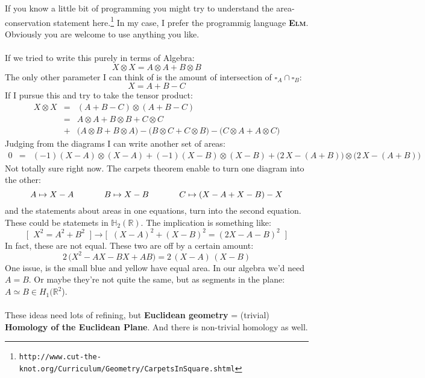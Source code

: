 \documentclass[12pt]{article}
\begin{document}
If you know a little bit of programming you might try to understand the area-conservation statement here.\footnote{\texttt{http://www.cut-the-knot.org/Curriculum/Geometry/CarpetsInSquare.shtml}} In my case, I prefer the programmig language \textsc{\textbf{Elm}}.  Obviously you are welcome to use anything you like. \\ \\
If we tried to write this purely in terms of Algebra:
$$ X \otimes X = A \otimes A + B \otimes B  $$
The only other parameter I can think of is the amount of intersection of $\square_A \cap \square_B$:
$$  X = A + B - C $$
If I pursue this and try to take the tensor product:
\begin{eqnarray*} X \otimes X &=& (A + B - C) \otimes (A + B - C) \\  
&=& A \otimes A + B \otimes B + C \otimes C \\
&+& \big( A \otimes B + B \otimes A\big)
- \big( B \otimes C + C \otimes B\big)
- \big( C \otimes A + A \otimes C\big) \end{eqnarray*}
Judging from the diagrams I can write another set of areas:
\begin{eqnarray*}
0 &=& (-1)(X-A) \otimes (X-A) + (-1)(X-B) \otimes (X-B) +
\Big( 2\,X - (A+B) \Big)\otimes \Big(2\,X - (A+B)\Big) \end{eqnarray*}
Not totally sure right now.  The carpets theorem enable to turn one diagram into the other:
$$ A \mapsto X - A \hspace{0.5in} B \mapsto X-B 
\hspace{0.5in} C \mapsto (X-A+X-B)-X$$
and the statements about areas in one equations, turn into the second equation.  These could be statemets in $\mathbb{H}_2 (\mathbb{R})$.  The implication is something like:
$$ \bigg[ \;\; X^2 = A^2 + B^2 \;\; \bigg] \to \Bigg[\;\; (X-A)^2 + (X-B)^2 = (2X - A - B)^2 \;\; \Bigg] $$
In fact, these are not equal.  These two are off by a certain amount:
$$ 2 \,\big( X^2 - AX - BX + AB \big) = 2 \,(X-A)\,(X-B) $$
One issue, is the small blue and yellow have equal area.  In our algebra we'd need $A = B$.  Or maybe they're not quite the same, but as segments in the plane: $ A \simeq B \in H_1(\mathbb{R}^2$). \\ \\
These ideas need lots of refining, but \textbf{Euclidean geometry} = (trivial) \textbf{Homology of the Euclidean Plane}.  And there is non-trivial homology as well.

\newpage
\end{document}
